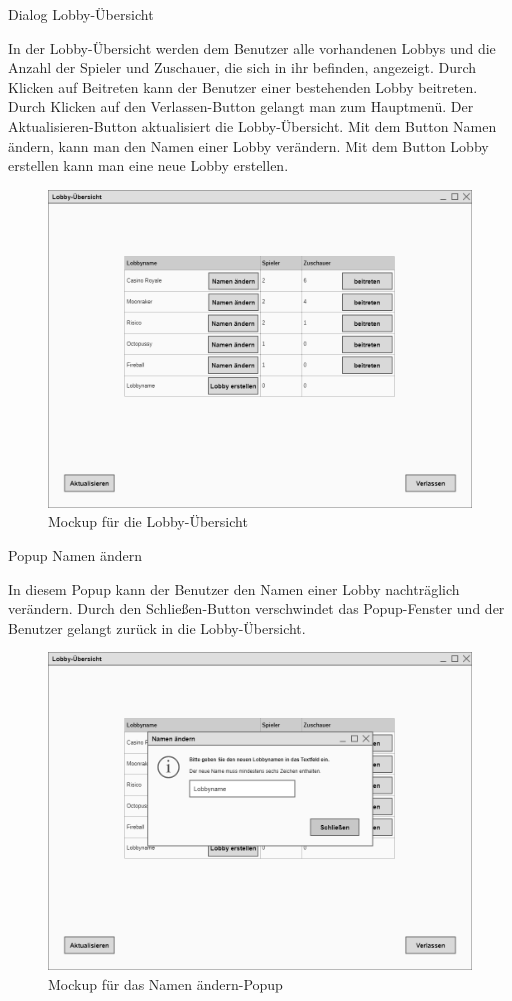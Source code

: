 Dialog \glqq{}Lobby-Übersicht\grqq{}

In der Lobby-Übersicht werden dem Benutzer alle vorhandenen Lobbys und die Anzahl der Spieler und Zuschauer, die sich in ihr befinden, angezeigt. Durch Klicken auf Beitreten kann der Benutzer einer bestehenden Lobby beitreten. Durch Klicken auf den Verlassen-Button gelangt man zum Hauptmenü. Der Aktualisieren-Button aktualisiert die Lobby-Übersicht. Mit dem Button Namen ändern, kann man den Namen einer Lobby verändern. Mit dem Button Lobby erstellen kann man eine neue Lobby erstellen.

\begin{figure}
  \centering
  \includegraphics[width=\textwidth]{Meilenstein03/Lobby-Uebersicht_Mockup.png}
  \caption{Mockup für die Lobby-Übersicht}
\end{figure}

Popup \glqq{}Namen ändern\grqq{}

In diesem Popup kann der Benutzer den Namen einer Lobby nachträglich verändern. Durch den Schließen-Button verschwindet das Popup-Fenster und der Benutzer gelangt zurück in die Lobby-Übersicht.

\begin{figure}
  \centering
  \includegraphics[width=\textwidth]{Meilenstein03/NamenAendern_Mockup.png}
  \caption{Mockup für das Namen ändern-Popup}
\end{figure}

